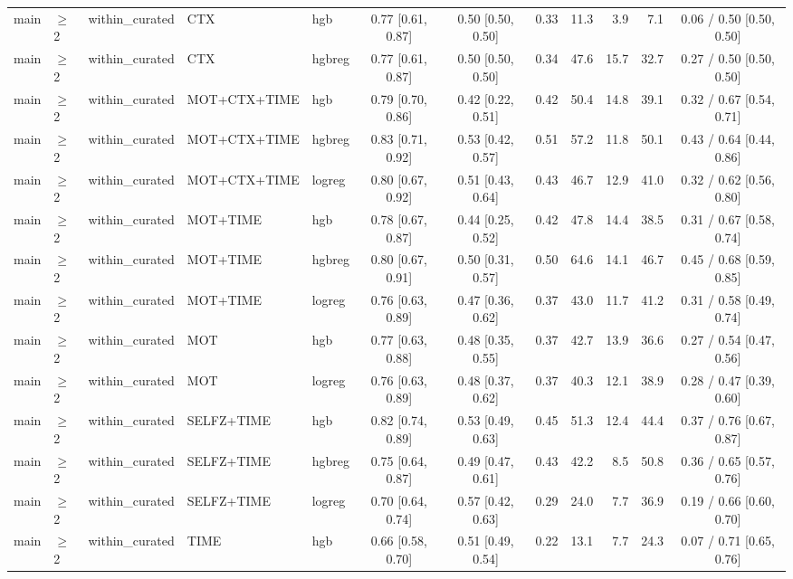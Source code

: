 \begin{longtable}{@{}lllllcccrrrc@{}}
main & $\geq$2 & within\_curated & CTX & hgb & 0.77 [0.61, 0.87] & 0.50 [0.50, 0.50] & 0.33 & 11.3 & 3.9 & 7.1 & 0.06 / 0.50 [0.50, 0.50] \\
main & $\geq$2 & within\_curated & CTX & hgbreg & 0.77 [0.61, 0.87] & 0.50 [0.50, 0.50] & 0.34 & 47.6 & 15.7 & 32.7 & 0.27 / 0.50 [0.50, 0.50] \\
main & $\geq$2 & within\_curated & MOT+CTX+TIME & hgb & 0.79 [0.70, 0.86] & 0.42 [0.22, 0.51] & 0.42 & 50.4 & 14.8 & 39.1 & 0.32 / 0.67 [0.54, 0.71] \\
main & $\geq$2 & within\_curated & MOT+CTX+TIME & hgbreg & 0.83 [0.71, 0.92] & 0.53 [0.42, 0.57] & 0.51 & 57.2 & 11.8 & 50.1 & 0.43 / 0.64 [0.44, 0.86] \\
main & $\geq$2 & within\_curated & MOT+CTX+TIME & logreg & 0.80 [0.67, 0.92] & 0.51 [0.43, 0.64] & 0.43 & 46.7 & 12.9 & 41.0 & 0.32 / 0.62 [0.56, 0.80] \\
main & $\geq$2 & within\_curated & MOT+TIME & hgb & 0.78 [0.67, 0.87] & 0.44 [0.25, 0.52] & 0.42 & 47.8 & 14.4 & 38.5 & 0.31 / 0.67 [0.58, 0.74] \\
main & $\geq$2 & within\_curated & MOT+TIME & hgbreg & 0.80 [0.67, 0.91] & 0.50 [0.31, 0.57] & 0.50 & 64.6 & 14.1 & 46.7 & 0.45 / 0.68 [0.59, 0.85] \\
main & $\geq$2 & within\_curated & MOT+TIME & logreg & 0.76 [0.63, 0.89] & 0.47 [0.36, 0.62] & 0.37 & 43.0 & 11.7 & 41.2 & 0.31 / 0.58 [0.49, 0.74] \\
main & $\geq$2 & within\_curated & MOT & hgb & 0.77 [0.63, 0.88] & 0.48 [0.35, 0.55] & 0.37 & 42.7 & 13.9 & 36.6 & 0.27 / 0.54 [0.47, 0.56] \\
main & $\geq$2 & within\_curated & MOT & logreg & 0.76 [0.63, 0.89] & 0.48 [0.37, 0.62] & 0.37 & 40.3 & 12.1 & 38.9 & 0.28 / 0.47 [0.39, 0.60] \\
main & $\geq$2 & within\_curated & SELFZ+TIME & hgb & 0.82 [0.74, 0.89] & 0.53 [0.49, 0.63] & 0.45 & 51.3 & 12.4 & 44.4 & 0.37 / 0.76 [0.67, 0.87] \\
main & $\geq$2 & within\_curated & SELFZ+TIME & hgbreg & 0.75 [0.64, 0.87] & 0.49 [0.47, 0.61] & 0.43 & 42.2 & 8.5 & 50.8 & 0.36 / 0.65 [0.57, 0.76] \\
main & $\geq$2 & within\_curated & SELFZ+TIME & logreg & 0.70 [0.64, 0.74] & 0.57 [0.42, 0.63] & 0.29 & 24.0 & 7.7 & 36.9 & 0.19 / 0.66 [0.60, 0.70] \\
main & $\geq$2 & within\_curated & TIME & hgb & 0.66 [0.58, 0.70] & 0.51 [0.49, 0.54] & 0.22 & 13.1 & 7.7 & 24.3 & 0.07 / 0.71 [0.65, 0.76] \\

\end{longtable}
